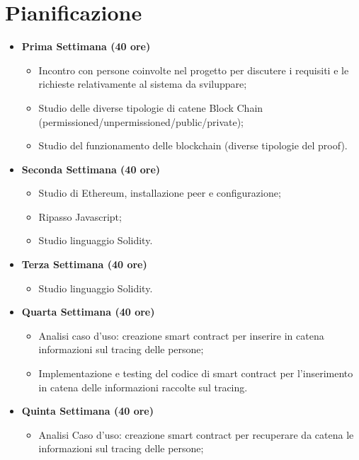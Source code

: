 \section{Pianificazione}
\begin{itemize}
        \item \textbf{Prima Settimana (40 ore)}
        \begin{itemize}
            \item Incontro con persone coinvolte nel progetto per discutere i requisiti e le richieste
            relativamente al sistema da sviluppare;
            \item Studio delle diverse tipologie di catene Block Chain (permissioned/unpermissioned/public/private); 
            \item Studio del funzionamento delle blockchain (diverse tipologie del proof).
        \end{itemize}
        \item \textbf{Seconda Settimana (40 ore)} 
        \begin{itemize}
            \item Studio di Ethereum, installazione peer e configurazione;
	    \item Ripasso Javascript;	
	    \item Studio linguaggio Solidity.
        \end{itemize}
        \item \textbf{Terza Settimana (40 ore)} 
        \begin{itemize}
            \item Studio linguaggio Solidity.
        \end{itemize}
        \item \textbf{Quarta Settimana (40 ore)} 
        \begin{itemize}
            \item Analisi caso d'uso: creazione smart contract per inserire in catena informazioni sul tracing delle persone;
	    \item Implementazione e testing del codice di smart contract per l'inserimento in catena delle informazioni raccolte sul tracing.
        \end{itemize}
        \item \textbf{Quinta Settimana (40 ore)} 
        \begin{itemize}
            \item Analisi Caso d'uso: creazione smart contract per recuperare da catena le informazioni sul tracing delle persone;

\end{itemize}
\end{itemize}
